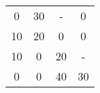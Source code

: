 \begin{tabular}{cccc}
\rowcolor[rgb]{ .749,  .749,  .749} 0      & 30     & -      & \cellcolor[rgb]{ .929,  .49,  .192} 0 \\
\rowcolor[rgb]{ .749,  .749,  .749} 10     & 20     & \cellcolor[rgb]{ .929,  .49,  .192} 0 & 0 \\
10     & \cellcolor[rgb]{ .929,  .49,  .192} 0 & \cellcolor[rgb]{ .749,  .749,  .749} 20 & - \\
\rowcolor[rgb]{ .929,  .49,  .192} 0      & \cellcolor[rgb]{ .749,  .749,  .749} 0 & \cellcolor[rgb]{ .749,  .749,  .749} 40 & \cellcolor[rgb]{ .749,  .749,  .749} 30 \bigstrut[b]\\
\hline
\hline
\end{tabular}%
